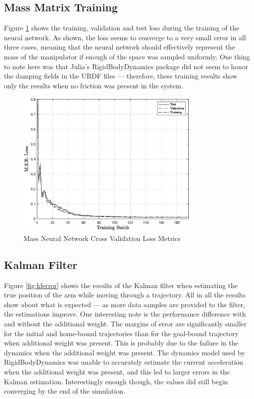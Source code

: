 \subsection*{Mass Matrix Training}

Figure \ref{fig:massnnloss} shows the training, validation and test loss during the training of the neural network.
As shown, the loss seems to converge to a very small error in all three cases, meaning that the neural network should effectively represent the mass of the manipulator if enough of the space was sampled uniformly.
One thing to note here was that Julia's RigidBodyDynamics package did not seem to honor the damping fields in the URDF files --- therefore, these training results show only the results when no friction was present in the system.

\begin{figure}[H]
  \centering
  \includegraphics[width=0.80\textwidth]{figures/massnnloss_plot.eps}
  \caption{Mass Neural Network Cross Validation Loss Metrics}
  \label{fig:massnnloss}
\end{figure}

\subsection*{Kalman Filter}
Figure \ref{fig:kferror} shows the results of the Kalman filter when estimating the true position of the arm while moving through a trajectory.
All in all the results show about what is expected --- as more data samples are provided to the filter, the estimations improve.
One interesting note is the performance difference with and without the additional weight.
The margins of error are significantly smaller for the initial and home-bound trajectories than for the goal-bound trajectory when additional weight was present.
This is probably due to the failure in the dynamics when the additional weight was present.
The dynamics model used by RigidBodyDynamics was unable to accurately estimate the current acceleration when the additional weight was present, and this led to larger errors in the Kalman estimation.
Interestingly enough though, the values did still begin converging by the end of the simulation.

